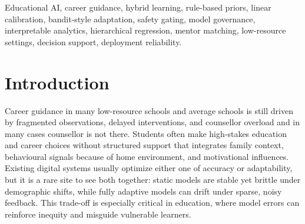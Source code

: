 \documentclass[conference]{IEEEtran}
\begin{document}
\maketitle

\begin{abstract}
This paper presents a deployment-oriented and AI framework for student career and support analytics in low-resource school or the mid-level schools. The system integrates five survey dimensions—family background means what is the profession of the child’s parents, problems in home, behavioural impact which is there on the child, family income, and role-model influence—into a unified pipeline with API delivery and dashboard visualization. We use rule-based priors, linear calibration, and bandit-style online adaptation as our methods. Then we use safety gating to stop harmful model promotion. In grouped offline evaluation of the background module (train/validation/test: 587/125/121), unconstrained adaptive updates performed worse than a simple linear baseline (test RMSE 1.961 vs. 0.863), so the adaptive model was not used. An ablation across rules-only, linear-only, RL-only, and hybrid-gated variants shows that the proposed hybrid governance strategy preserves reliability while retaining adaptation capability. The framework also provides interpretable hierarchical regression for career-confidence factors and feedback-aware mentor matching. Results suggest that trustworthy, guard railed hybrid learning is more practical than pure RL in noisy educational environments for real-world decision support and sustainable deployment.
\end{abstract}

\begin{IEEEkeywords}
Educational AI, career guidance, hybrid learning, rule-based priors, linear calibration, bandit-style adaptation, safety gating, model governance, interpretable analytics, hierarchical regression, mentor matching, low-resource settings, decision support, deployment reliability.
\end{IEEEkeywords}

\section{Introduction}

Career guidance in many low-resource schools and average schools is still driven by fragmented observations, delayed interventions, and counsellor overload and in many cases counsellor is not there. Students often make high-stakes education and career choices without structured support that integrates family context, behavioural signals because of home environment, and motivational influences. Existing digital systems usually optimize either one of  accuracy or adaptability, but it is a rare site to see both together: static models are stable yet brittle under demographic shifts, while fully adaptive models can drift under sparse, noisy feedback. This trade-off is especially critical in education, where model errors can reinforce inequity and misguide vulnerable learners.
\end{document}
